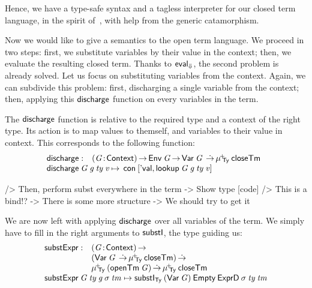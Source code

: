 Hence, we have a type-safe syntax and a tagless interpreter for our
closed term language, in the spirit
of~\citet{augustsson.carlsson:dependent.interpreter}, with help from
the generic catamorphism.


\newcommand{\discharge}{\F{discharge}}

Now we would like to give a semantics to the open term language. We
proceed in two steps: first, we substitute variables by their value in
the context; then, we evaluate the resulting closed term. Thanks to
$\evalH$, the second problem is already solved. Let us focus on
substituting variables from the context. Again, we can subdivide this
problem: first, discharging a single variable from the context; then,
applying this $\discharge$ function on every variables in the term.

The $\discharge$ function is relative to the required type and a
context of the right type. Its action is to map values to themself,
and variables to their value in context. This corresponds to the
following function:
%
\[\stk{
\begin{array}{@{}ll}
\discharge : & \PI{\V{G}}{\Ctxt}
               \Env{\V{G}} \To 
               \Var{\V{G}}{} \DotTo
               \muide{\Ty}{\closeTerm}
\end{array} \\
\begin{array}{@{}l@{\:\mapsto\:\:}l}
\discharge\: \V{G}\: \V{g}\: \V{ty}\: \V{v} &
    \Con{\pair{\SYMBEval}{\lookup{\V{G}}{\V{g}}{\V{ty}}{\V{v}}}{}}
\end{array}
}\]

\begin{wstructure}
            /> Then, perform subst everywhere in the term
                -> Show type [code]
                /> This is a bind!?
                -> There is some more structure 
                    -> We should try to get it
\end{wstructure}

\newcommand{\substH}{\F{substExpr}}

We are now left with applying $\discharge$ over all variables of the
term.  We simply have to fill in the right arguments to $\substI$, the
type guiding us:
%
\[
\stk{
\begin{array}{@{}ll}
\substH  : & \PI{\V{G}}{\Ctxt} \\
           & (\Var{\V{G}}{} \DotTo
              \muide{\Ty}{\closeTerm}) \DotTo \\
          & \muide{\Ty}{(\openTerm{\V{G}})} \DotTo 
            \muide{\Ty}{\closeTerm}
\end{array} \\
\substH\: \V{G}\:
          \V{ty}\:          
          \V{g}\:
          \V{\sigma}\: 
          \V{tm} \mapsto  
\substI_{\Ty}\:
               (\SYMBVar\: \V{G})\: 
               \SYMBEmpty\:
               \HExprD\: 
               \V{\sigma}\:
               \V{ty}\:
               \V{tm}
}\]

